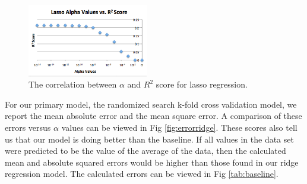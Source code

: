 \begin{figure}[htb]



  \centering  %

  \includegraphics[width=0.47\textwidth]{figs/LassoR2.png}

  \caption{The correlation between $\alpha$ and $R^2$ score for lasso regression.}

  \label{fig:LassoAvS}

\end{figure}


For our primary model, the randomized search k-fold cross validation model,
we report the mean absolute error and the mean square error. A comparison
of these errors versus $\alpha$ values can be viewed in Fig \ref{fig:errorridge}.
These scores also tell us that our model is doing better than the baseline.
If all values in the data set were predicted to be the value of the average 
of the data, then the calculated mean and absolute squared errors would
be higher than those found in our ridge regression model. The calculated
errors can be viewed in Fig \ref{tab:baseline}. \\


